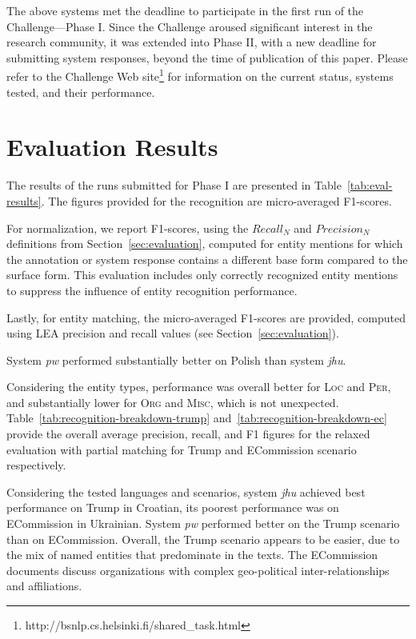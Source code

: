 \documentclass[11pt]{article}
\begin{document}
The above systems met the deadline to participate in the first run of the
Challenge---Phase I.
%
Since the Challenge aroused significant interest in the research
community, it was extended into Phase II, with a new deadline for
submitting system responses, beyond the time of publication of this
paper.  Please refer to the Challenge Web
site\footnote{http://bsnlp.cs.helsinki.fi/shared\_task.html} for
information on the current status, systems tested, and their performance.

\section{Evaluation Results}
\label{sec:results}

The results of the runs submitted for Phase I are presented in
Table~\ref{tab:eval-results}.  The figures provided for the recognition
are micro-averaged F1-scores.

For normalization, we report F1-scores, using the $\mathit{Recall}_{N}$ and
$\mathit{Precision}_{N}$ definitions from Section~\ref{sec:evaluation}, computed
for entity mentions for which the annotation or system response contains
a different base form compared to the surface form.  This evaluation
includes only correctly recognized entity mentions to suppress the
influence of entity recognition performance.

Lastly, for entity matching, the micro-averaged F1-scores are provided,
computed using LEA precision and recall values (see
Section~\ref{sec:evaluation}).

System {\em pw} performed substantially better on Polish than system {\em
  jhu}.

Considering the entity types, performance was overall better for \textsc{Loc} and
\textsc{Per}, and substantially lower for \textsc{Org} and \textsc{Misc}, which is not unexpected. 
Table~\ref{tab:recognition-breakdown-trump} and~\ref{tab:recognition-breakdown-ec}
provide the overall average precision, recall, and F1 figures for the relaxed evaluation
with partial matching for {\sc Trump} and {\sc ECommission} scenario respectively.

Considering the tested languages and scenarios, system {\em jhu} achieved
best performance on {\sc Trump} in Croatian, its poorest performance was
on {\sc ECommission} in Ukrainian.  System {\em pw} performed better on
the {\sc Trump} scenario than on {\sc ECommission}.  Overall, the {\sc
  Trump} scenario appears to be easier, due to the mix of named entities
that predominate in the texts.  The {\sc ECommission} documents discuss
organizations with complex geo-political inter-relationships and
affiliations.
\end{document}
